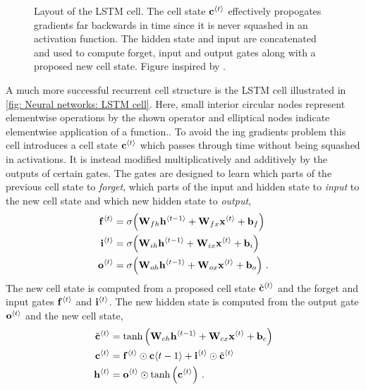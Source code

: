 \begin{figure}[tbp!]
    \centering
    
    \caption{Layout of the \gls{LSTM} cell. The cell state ${\mathbf{c}}^{\left\langle t\right\rangle}$ effectively propogates gradients far backwards in time since it is never squashed in an activation function. The hidden state and input are concatenated and used to compute forget, input and output gates along with a proposed new cell state. Figure inspired by \cite{Olah2015}.}
    \label{fig: Neural networks: LSTM cell} 
\end{figure}
A much more successful recurrent cell structure is the \gls{LSTM} cell \cite{Hochreiter1997} illustrated in \autoref{fig: Neural networks: LSTM cell}. Here, small interior circular nodes represent elementwise operations by the shown operator and elliptical nodes indicate elementwise application of a function.. To avoid the ing gradients problem this cell introduces a cell state ${\mathbf{c}}^{\left\langle t\right\rangle}$ which passes through time without being squashed in activations. It is instead modified multiplicatively and additively by the outputs of certain gates. The gates are designed to learn which parts of the previous cell state to \textit{forget}, which parts of the input and hidden state to \textit{input} to the new cell state and which new hidden state to \textit{output},
\begin{subequations}
    \begin{align}
        {\mathbf{f}}^{\left\langle t\right\rangle} &= \sigma{\left({\mathbf{W}}_{fh}{\mathbf{h}}^{\left\langle t-1\right\rangle}+{\mathbf{W}}_{fx}{\mathbf{x}}^{\left\langle t\right\rangle}+{\mathbf{b}}_f\right)}\\
        {\mathbf{i}}^{\left\langle t\right\rangle} &= \sigma{\left({\mathbf{W}}_{ih}{\mathbf{h}}^{\left\langle t-1\right\rangle}+{\mathbf{W}}_{ix}{\mathbf{x}}^{\left\langle t\right\rangle}+{\mathbf{b}}_i\right)}\\
        {\mathbf{o}}^{\left\langle t\right\rangle} &= \sigma{\left({\mathbf{W}}_{oh}{\mathbf{h}}^{\left\langle t-1\right\rangle}+{\mathbf{W}}_{ox}{\mathbf{x}}^{\left\langle t\right\rangle}+{\mathbf{b}}_o\right)} \ .
    \end{align}
\end{subequations}
The new cell state is computed from a proposed cell state $\tilde{{\mathbf{c}}}^{\left\langle t\right\rangle}$ and the forget and input gates  ${\mathbf{f}}^{\left\langle t\right\rangle}$ and ${\mathbf{i}}^{\left\langle t\right\rangle}$. The new hidden state is computed from the output gate ${\mathbf{o}}^{\left\langle t\right\rangle}$ and the new cell state,
\begin{subequations}
    \begin{align}
        \tilde{{\mathbf{c}}}^{\left\langle t\right\rangle} &= \tanh{\left({\mathbf{W}}_{ch}{\mathbf{h}}^{\left\langle t-1\right\rangle}+{\mathbf{W}}_{cx}{\mathbf{x}}^{\left\langle t\right\rangle}+{\mathbf{b}}_c\right)}\\
        {\mathbf{c}}^{\left\langle t\right\rangle} &= {\mathbf{f}}^{\left\langle t\right\rangle}\odot{\mathbf{c}}{\left\langle t-1\right\rangle}+{\mathbf{i}}^{\left\langle t\right\rangle}\odot\tilde{{\mathbf{c}}}^{\left\langle t\right\rangle}\\
        {\mathbf{h}}^{\left\langle t\right\rangle} &= {\mathbf{o}}^{\left\langle t\right\rangle}\odot\tanh{\left({\mathbf{c}}^{\left\langle t\right\rangle}\right)} \ .
    \end{align}
\end{subequations}


